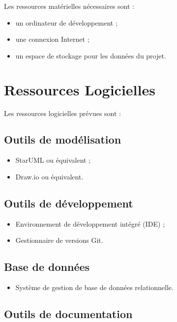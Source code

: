 \documentclass[12pt,a4paper]{report}
\providecommand{\tightlist}{\setlength{\itemsep}{0pt}\setlength{\parskip}{0pt}}
\begin{document}
Les ressources matérielles nécessaires sont :

\begin{itemize}
\item
  un ordinateur de développement ;
\item
  une connexion Internet ;
\item
  un espace de stockage pour les données du projet.
\end{itemize}

\section{Ressources Logicielles}\label{ressources-logicielles}

Les ressources logicielles prévues sont :

\subsection{Outils de modélisation}\label{outils-de-moduxe9lisation}

\begin{itemize}
\item
  StarUML ou équivalent ;
\item
  Draw.io ou équivalent.
\end{itemize}

\subsection{Outils de développement}\label{outils-de-duxe9veloppement}

\begin{itemize}
\item
  Environnement de développement intégré (IDE) ;
\item
  Gestionnaire de versions Git.
\end{itemize}

\subsection{Base de données}\label{base-de-donnuxe9es}

\begin{itemize}
\tightlist
\item
  Système de gestion de base de données relationnelle.
\end{itemize}

\subsection{Outils de documentation}\label{outils-de-documentation}
\end{document}
